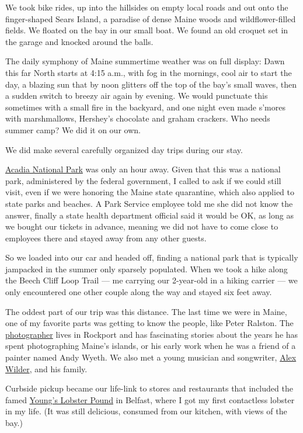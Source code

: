 We took bike rides, up into the hillsides on empty local roads and out
onto the finger-shaped Sears Island, a paradise of dense Maine woods and
wildflower-filled fields. We floated on the bay in our small boat. We
found an old croquet set in the garage and knocked around the balls.

The daily symphony of Maine summertime weather was on full display: Dawn
this far North starts at 4:15 a.m., with fog in the mornings, cool air
to start the day, a blazing sun that by noon glitters off the top of the
bay's small waves, then a sudden switch to breezy air again by evening.
We would punctuate this sometimes with a small fire in the backyard, and
one night even made s'mores with marshmallows, Hershey's chocolate and
graham crackers. Who needs summer camp? We did it on our own.

We did make several carefully organized day trips during our stay.

\href{https://www.nps.gov/acad/index.htm}{Acadia National Park} was only
an hour away. Given that this was a national park, administered by the
federal government, I called to ask if we could still visit, even if we
were honoring the Maine state quarantine, which also applied to state
parks and beaches. A Park Service employee told me she did not know the
answer, finally a state health department official said it would be OK,
as long as we bought our tickets in advance, meaning we did not have to
come close to employees there and stayed away from any other guests.

So we loaded into our car and headed off, finding a national park that
is typically jampacked in the summer only sparsely populated. When we
took a hike along the Beech Cliff Loop Trail --- me carrying our
2-year-old in a hiking carrier --- we only encountered one other couple
along the way and stayed six feet away.

The oddest part of our trip was this distance. The last time we were in
Maine, one of my favorite parts was getting to know the people, like
Peter Ralston. The
\href{https://www.ralstongallery.com/about}{photographer} lives in
Rockport and has fascinating stories about the years he has spent
photographing Maine's islands, or his early work when he was a friend of
a painter named Andy Wyeth. We also met a young musician and songwriter,
\href{https://www.alexwilder.com/about}{Alex Wilder}, and his family.

Curbside pickup became our life-link to stores and restaurants that
included the famed \href{https://www.youngslobsters.com/}{Young's
Lobster Pound} in Belfast, where I got my first contactless lobster in
my life. (It was still delicious, consumed from our kitchen, with views
of the bay.)

